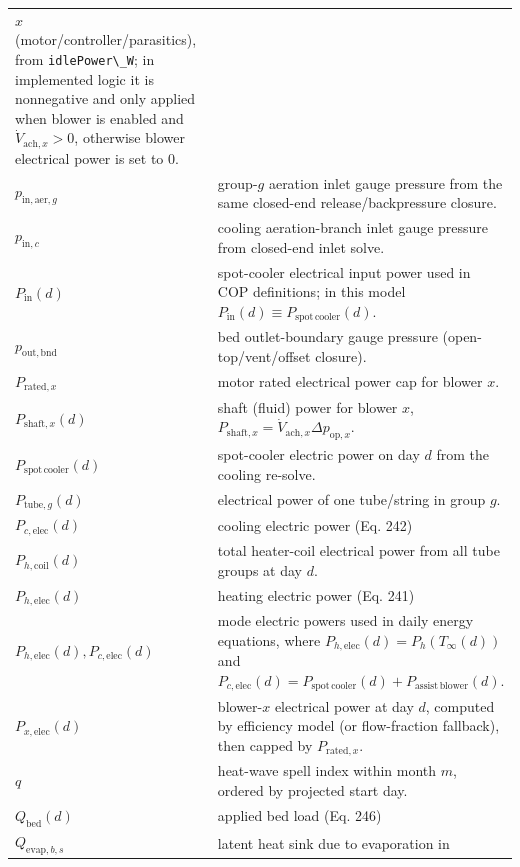 {\begin{longtable}[]{@{}
  >{\raggedright\arraybackslash}p{}
  >{\raggedright\arraybackslash}p{}@{}}
\(x\) (motor/controller/parasitics), from
\texttt{idlePower\textbackslash{}\_W}; in implemented logic it is
nonnegative and only applied when blower is enabled and
\(\dot V_{\mathrm{ach},x}>0\), otherwise blower electrical power is set
to \(0\). \\
\(p_{\mathrm{in,aer},g}\) & group-\(g\) aeration inlet gauge pressure
from the same closed-end release/backpressure closure. \\
\(p_{\mathrm{in},c}\) & cooling aeration-branch inlet gauge pressure
from closed-end inlet solve. \\
\(P_{\mathrm{in}}(d)\) & spot-cooler electrical input power used in COP
definitions; in this model
\(P_{\mathrm{in}}(d)\equiv P_{\mathrm{spot\,cooler}}(d)\). \\
\(p_{\mathrm{out,bnd}}\) & bed outlet-boundary gauge pressure
(open-top/vent/offset closure). \\
\(P_{\mathrm{rated},x}\) & motor rated electrical power cap for blower
\(x\). \\
\(P_{\mathrm{shaft},x}(d)\) & shaft (fluid) power for blower \(x\),
\(P_{\mathrm{shaft},x}=\dot V_{\mathrm{ach},x}\Delta p_{\mathrm{op},x}\). \\
\(P_{\mathrm{spot\,cooler}}(d)\) & spot-cooler electric power on day
\(d\) from the cooling re-solve. \\
\(P_{\mathrm{tube},g}(d)\) & electrical power of one tube/string in
group \(g\). \\
\(P_{c,\mathrm{elec}}(d)\) & cooling electric power (Eq. 242) \\
\(P_{h,\mathrm{coil}}(d)\) & total heater-coil electrical power from all
tube groups at day \(d\). \\
\(P_{h,\mathrm{elec}}(d)\) & heating electric power (Eq. 241) \\
\(P_{h,\mathrm{elec}}(d),P_{c,\mathrm{elec}}(d)\) & mode electric powers
used in daily energy equations, where
\(P_{h,\mathrm{elec}}(d)=P_h(T_\infty(d))\) and
\(P_{c,\mathrm{elec}}(d)=P_{\mathrm{spot\,cooler}}(d)+P_{\mathrm{assist\,blower}}(d)\). \\
\(P_{x,\mathrm{elec}}(d)\) & blower-\(x\) electrical power at day \(d\),
computed by efficiency model (or flow-fraction fallback), then capped by
\(P_{\mathrm{rated},x}\). \\
\(q\) & heat-wave spell index within month \(m\), ordered by projected
start day. \\
\(Q_{\mathrm{bed}}(d)\) & applied bed load (Eq. 246) \\
\(Q_{\mathrm{evap},b,s}\) & latent heat sink due to evaporation in

\end{longtable}}
